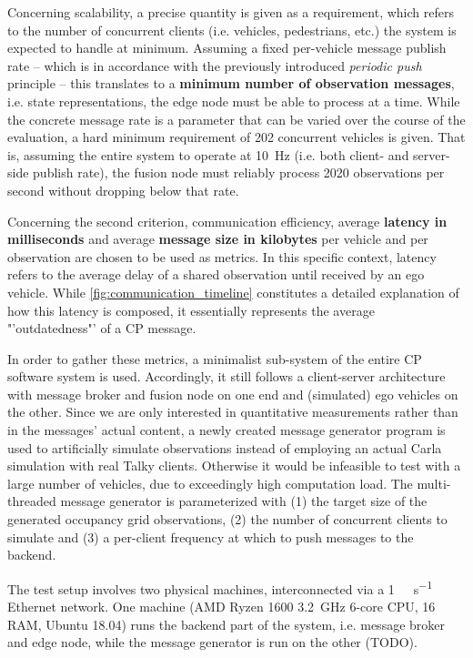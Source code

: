 Concerning scalability, a precise quantity is given as a requirement, which refers to the number of concurrent clients (i.e. vehicles, pedestrians, etc.) the system is expected to handle at minimum. Assuming a fixed per-vehicle message publish rate – which is in accordance with the previously introduced \textit{periodic push} principle – this translates to a \textbf{minimum number of observation messages}, i.e. state representations, the edge node must be able to process at a time. While the concrete message rate is a parameter that can be varied over the course of the evaluation, a hard minimum requirement of 202 concurrent vehicles is given. That is, assuming the entire system to operate at \SI{10}{Hz} (i.e. both client- and server-side publish rate), the fusion node must reliably process 2020 observations per second without dropping below that rate.

Concerning the second criterion, communication efficiency, average \textbf{latency in milliseconds} and average \textbf{message size in kilobytes} per vehicle and per observation are chosen to be used as metrics. In this specific context, latency refers to the average delay of a shared observation until received by an ego vehicle. While \cref{fig:communication_timeline} constitutes a detailed explanation of how this latency is composed, it essentially represents the average "'outdatedness"' of a CP message.

In order to gather these metrics, a minimalist sub-system of the entire CP software system is used. Accordingly, it still follows a client-server architecture with message broker and fusion node on one end and (simulated) ego vehicles on the other. Since we are only interested in quantitative measurements rather than in the messages' actual content, a newly created message generator program is used to artificially simulate observations instead of employing an actual Carla simulation with real Talky clients. Otherwise it would be infeasible to test with a large number of vehicles, due to exceedingly high computation load. The multi-threaded message generator is parameterized with (1) the target size of the generated occupancy grid observations, (2) the number of concurrent clients to simulate and (3) a per-client frequency at which to push messages to the backend. 

The test setup involves two physical machines, interconnected via a \SI{1}{\giga\bit\per\second} Ethernet network. One machine (AMD Ryzen 1600 \SI{3.2}{\giga\hertz} 6-core CPU, \SI{16}{\giga\byte} RAM, Ubuntu 18.04) runs the backend part of the system, i.e. message broker and edge node, while the message generator is run on the other (TODO).

